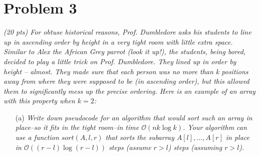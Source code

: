 \documentclass[11pt]{article} \setlength{\oddsidemargin}{0in}
\begin{document}
{\begin{enumerate}
  \end{enumerate}

  \newpage

  \section*{Problem 3}

  \textit{(20 pts) For obtuse historical reasons, Prof. Dumbledore asks
    his students to line up in ascending order by height in a very tight
    room with little extra space. Similar to Alex the African Grey
    parrot (look it up!), the students, being bored, decided to play a
    little trick on Prof. Dumbledore. They lined up in order by height --
    almost. They made sure that each person was no more than k positions
    away from where they were supposed to be (in ascending order), but
    this allowed them to significantly mess up the precise
    ordering. Here is an example of an array with this property when
    $k = 2$:}




  \begin{enumerate}
  \item[(a)]{\textit{Write down pseudocode for an algorithm that would	 %
        sort such an array in place--so it fits in the tight room--in time
        $\mathcal{O}(n k \log k)$. Your algorithm can use a function
        $sort(A, l, r)$ that sorts the subarray $A[l],\dots,A[r]$ in
        place in $\mathcal{O}((r-l) \log(r-l))$ steps (assume $r>l$)
        steps (assuming $r > l$).}}
    

\end{enumerate}}
\end{document}

